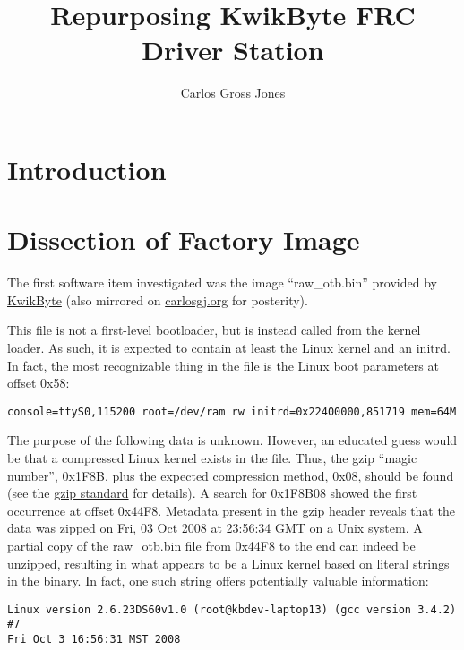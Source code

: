 \documentclass[]{article}
\title{Repurposing KwikByte FRC Driver Station}
\author{Carlos Gross Jones}
\begin{document}
\maketitle

\begin{abstract}

\end{abstract}

\section{Introduction}
\section{Dissection of Factory Image}
\par The first software item investigated was the image ``raw\_otb.bin'' provided by \href{http://www.kwikbyte.com/driverstation/binary/raw_otb.bin}{KwikByte} (also mirrored on \href{http://carlosgj.org/FRC/DS60/raw_otb.bin}{carlosgj.org} for posterity).
\par This file is not a first-level bootloader, but is instead called from the kernel loader. As such, it is expected to contain at least the Linux kernel and an initrd. In fact, the most recognizable thing in the file is the Linux boot parameters at offset 0x58:
\begin{verbatim}
console=ttyS0,115200 root=/dev/ram rw initrd=0x22400000,851719 mem=64M
\end{verbatim}
\par The purpose of the following data is unknown. However, an educated guess would be that a compressed Linux kernel exists in the file. Thus, the gzip ``magic number'', 0x1F8B, plus the expected compression method, 0x08, should be found (see the \href{https://tools.ietf.org/html/rfc1952}{gzip standard} for details). A search for 0x1F8B08 showed the first occurrence at offset 0x44F8. Metadata present in the gzip header reveals that the data was zipped on Fri, 03 Oct 2008 at 23:56:34 GMT on a Unix system. A partial copy of the raw\_otb.bin file from 0x44F8 to the end can indeed be unzipped, resulting in what appears to be a Linux kernel based on literal strings in the binary. In fact, one such string offers potentially valuable information:
\begin{verbatim}
Linux version 2.6.23DS60v1.0 (root@kbdev-laptop13) (gcc version 3.4.2) #7 
Fri Oct 3 16:56:31 MST 2008
\end{verbatim}
\end{document}
